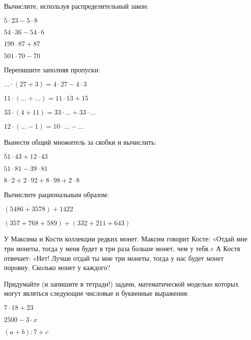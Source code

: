 \begin{listofex}
	\item Вычислите, используя распределительный закон:
	\begin{enumcols}[itemcolumns=2]
		\item \( 5\cdot23-5\cdot8 \)
		\item \( 54\cdot36-54\cdot6 \)
		\item \( 199\cdot87+87 \)
		\item \( 501\cdot70-70 \)
	\end{enumcols}
	\item Перепишите заполняя пропуски:
	\begin{enumcols}[itemcolumns=2]
		\item \( {\dots}\cdot(27+3)=4\cdot27-4\cdot3 \)
		\item \( 11\cdot({\dots}+{\dots})=11\cdot13+15 \)
		\item \( 33\cdot(4+11)=33\cdot{\dots}+33\cdot{\dots} \)
		\item \( 12\cdot({\dots}-1)=10\cdot{\dots}-{\dots} \)
	\end{enumcols}
	\item Вынести общий множитель за скобки и вычислить:
	\begin{enumcols}[itemcolumns=3]
		\item \( 51\cdot43+12\cdot43 \)
		\item \( 51\cdot81-39\cdot81 \)
		\item \( 8\cdot2+2\cdot92+8\cdot98+2\cdot8 \)
	\end{enumcols}
	\item Вычислите рациональным образом:
	\begin{enumcols}[itemcolumns=2]
		\item \( (5486+3578)+1422 \)
		\item \( (357+768+589)+(332+211+643) \)
	\end{enumcols}
	\item У Максима и Кости коллекции редких монет. Максим говорит Косте: «Отдай мне три монеты, тогда у меня будет в три раза больше
	монет, чем у тебя.» А Костя отвечает: «Нет! Лучше отдай ты мне три монеты, тогда у нас будет монет поровну. Сколько монет у каждого?
	\item Придумайте (и запишите в тетради!) задачи, математической моделью которых могут
	являться следующие числовые и буквенные выражения:
	\begin{enumcols}[itemcolumns=3]
		\item \( 7\cdot18+23 \)
		\item \( 2500 - 3\cdot x \)
		\item \( (a+b):7+c \)
	\end{enumcols}
\end{listofex}
